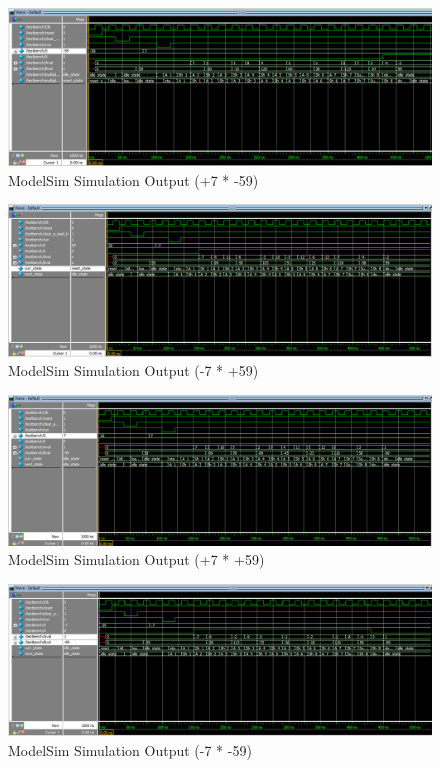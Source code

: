 \documentclass[journal, twocolumn, final,11pt,letterpaper]{IEEEtran}
\begin{document}
\begin{figure} [htbp]
	\centering
	\includegraphics[scale=0.4]{simulation1.png}
	\caption{ModelSim Simulation Output (+7 * -59)\label{fig:simulation1}}
\end{figure}

\begin{figure} [htbp]
	\centering
	\includegraphics[scale=0.4]{simulation2.png}
	\caption{ModelSim Simulation Output (-7 * +59)\label{fig:simulation2t}}
\end{figure}

\begin{figure} [htbp]
	\centering
	\includegraphics[scale=0.4]{simulation3.png}
	\caption{ModelSim Simulation Output (+7 * +59)\label{fig:simulation3}}
\end{figure}

\begin{figure} [htbp]
	\centering
	\includegraphics[scale=0.4]{simulation4.png}
	\caption{ModelSim Simulation Output (-7 * -59)\label{fig:simulation4}}
\end{figure}
\end{document}
